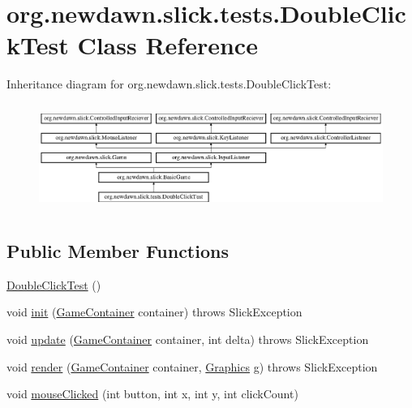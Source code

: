 \hypertarget{classorg_1_1newdawn_1_1slick_1_1tests_1_1_double_click_test}{}\section{org.\+newdawn.\+slick.\+tests.\+Double\+Click\+Test Class Reference}
\label{classorg_1_1newdawn_1_1slick_1_1tests_1_1_double_click_test}
Inheritance diagram for org.\+newdawn.\+slick.\+tests.\+Double\+Click\+Test\+:\begin{figure}[H]
\begin{center}
\leavevmode
\includegraphics[height=3.522012cm]{classorg_1_1newdawn_1_1slick_1_1tests_1_1_double_click_test}
\end{center}
\end{figure}
\subsection*{Public Member Functions}
\begin{DoxyCompactItemize}
\item 
\mbox{\hyperlink{classorg_1_1newdawn_1_1slick_1_1tests_1_1_double_click_test_ad24f50877789bacdf4cae61677529ca5}{Double\+Click\+Test}} ()
\item 
void \mbox{\hyperlink{classorg_1_1newdawn_1_1slick_1_1tests_1_1_double_click_test_af05802df0ef6f5949a4c0d67c26947f0}{init}} (\mbox{\hyperlink{classorg_1_1newdawn_1_1slick_1_1_game_container}{Game\+Container}} container)  throws Slick\+Exception 
\item 
void \mbox{\hyperlink{classorg_1_1newdawn_1_1slick_1_1tests_1_1_double_click_test_a56eac0e1f8180ecabcd3ccb9d6b45b71}{update}} (\mbox{\hyperlink{classorg_1_1newdawn_1_1slick_1_1_game_container}{Game\+Container}} container, int delta)  throws Slick\+Exception 
\item 
void \mbox{\hyperlink{classorg_1_1newdawn_1_1slick_1_1tests_1_1_double_click_test_ab6ee51a36736c603dad7aa7e89dc7ff1}{render}} (\mbox{\hyperlink{classorg_1_1newdawn_1_1slick_1_1_game_container}{Game\+Container}} container, \mbox{\hyperlink{classorg_1_1newdawn_1_1slick_1_1_graphics}{Graphics}} g)  throws Slick\+Exception 
\item 
void \mbox{\hyperlink{classorg_1_1newdawn_1_1slick_1_1tests_1_1_double_click_test_a38920aa6fbd2b5ec525f229bcc2a7769}{mouse\+Clicked}} (int button, int x, int y, int click\+Count)
\end{DoxyCompactItemize}
